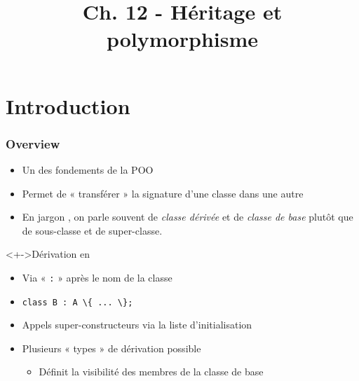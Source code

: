 


\title{Ch. 12 - Héritage et polymorphisme}




\section{Introduction}

\begin{frame}
\frametitle{Overview}
\begin{itemize}[<+->]
\item Un des fondements de la POO
\item Permet de « transférer » la signature d'une classe dans une autre
\item En jargon \cpp, on parle souvent de \emph{classe dérivée} et de \emph{classe de base} plutôt que de sous-classe et de super-classe.
\end{itemize}
\begin{exampleblock}<+->{Dérivation en \cpp}
	\begin{itemize}[<+->]
	\item Via « \texttt{:} » après le nom de la classe
	\item \lstinline|class B : A \{ ... \};|	
	\item Appels super-constructeurs via la liste d'initialisation
	\end{itemize}
\end{exampleblock}
\begin{itemize}[<+->]
\item Plusieurs « types » de dérivation possible
	\begin{itemize}
	\item Définit la visibilité des membres de la classe de base
	\end{itemize}
\end{itemize}
\end{frame}

